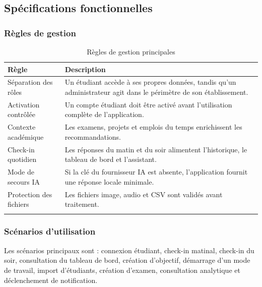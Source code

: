 \documentclass{rapportENSET}
\begin{document}
\subsection{Spécifications fonctionnelles}
\subsubsection*{Règles de gestion}
\begin{longtable}{@{}L{0.34\textwidth}L{0.56\textwidth}@{}}
\toprule
\textbf{Règle} & \textbf{Description} \\
\midrule
\endhead
Séparation des rôles & Un étudiant accède à ses propres données, tandis qu'un administrateur agit dans le périmètre de son établissement. \\
Activation contrôlée & Un compte étudiant doit être activé avant l'utilisation complète de l'application. \\
Contexte académique & Les examens, projets et emplois du temps enrichissent les recommandations. \\
Check-in quotidien & Les réponses du matin et du soir alimentent l'historique, le tableau de bord et l'assistant. \\
Mode de secours IA & Si la clé du fournisseur IA est absente, l'application fournit une réponse locale minimale. \\
Protection des fichiers & Les fichiers image, audio et CSV sont validés avant traitement. \\
\bottomrule
\caption{Règles de gestion principales}
\end{longtable}

\subsubsection*{Scénarios d'utilisation}
Les scénarios principaux sont : connexion étudiant, check-in matinal, check-in du soir, consultation du tableau de bord, création d'objectif, démarrage d'un mode de travail, import d'étudiants, création d'examen, consultation analytique et déclenchement de notification.
\end{document}
